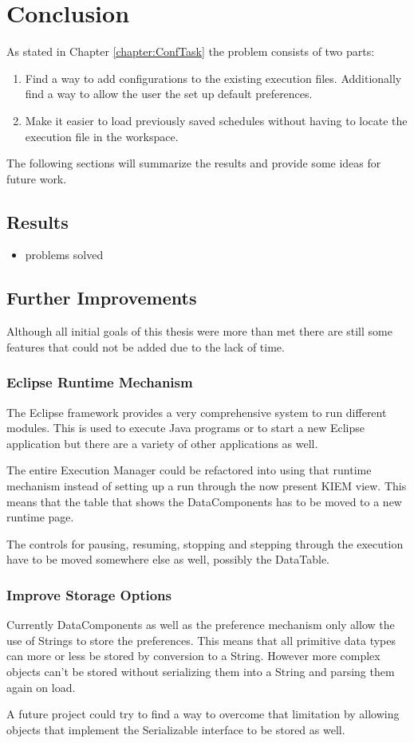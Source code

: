 \chapter{Conclusion}
\label{chapter:ConfConclusion}
As stated in Chapter \ref{chapter:ConfTask} the problem consists of two parts:
\begin{enumerate}
 \item Find a way to add configurations to the existing execution files. Additionally find
a way to allow the user the set up default preferences.
 \item Make it easier to load previously saved schedules without having to locate
the execution file in the workspace.
\end{enumerate}
The following sections will summarize the results and provide some ideas for
future work.

\section{Results}
\begin{itemize}
 \item problems solved
\end{itemize}

\section{Further Improvements}
Although all initial goals of this thesis were more than met there are still
some features that could not be added due to the lack of time.
\subsection*{Eclipse Runtime Mechanism}
The Eclipse framework provides a very comprehensive system to run different
modules. This is used to execute Java programs or to start a new Eclipse application
but there are a variety of other applications as well.

The entire Execution Manager could be refactored into using that runtime mechanism instead
of setting up a run through the now present \ac{KIEM} view. This means that the table
that shows the DataComponents has to be moved to a new runtime page. 

The controls for pausing, resuming, stopping and stepping through the execution have to
be moved somewhere else as well, possibly the DataTable.

\subsection*{Improve Storage Options}
Currently DataComponents as well as the preference mechanism only allow the use of
Strings to store the preferences. This means that all primitive data types can more
or less be stored by conversion to a String. However more complex objects can't be stored
without serializing them into a String and parsing them again on load.

A future project could try to find a way to overcome that limitation by allowing
objects that implement the Serializable interface to be stored as well.